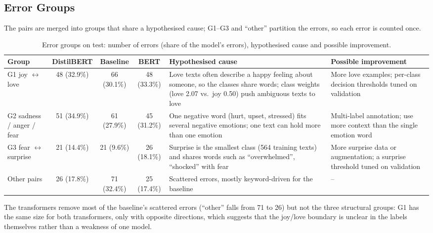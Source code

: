 \documentclass[11pt,a4paper]{article}
\begin{document}
\subsection{Error Groups}
The pairs are merged into groups that share a hypothesised cause; G1--G3 and ``other'' partition the errors, so each error is counted once.

\begin{table}[H]
\centering
\caption{Error groups on test: number of errors (share of the model's errors), hypothesised cause and possible improvement.}
\label{tab:groups}
\footnotesize
\begin{tabularx}{\textwidth}{@{}p{2.2cm}ccc LL@{}}
\toprule
\textbf{Group} & \textbf{DistilBERT} & \textbf{Baseline} & \textbf{BERT} & \textbf{Hypothesised cause} & \textbf{Possible improvement}\\
\midrule
G1 joy $\leftrightarrow$ love & 48 (32.9\%) & 66 (30.1\%) & 48 (33.3\%) & Love texts often describe a happy feeling about someone, so the classes share words; class weights (love 2.07 vs.\ joy 0.50) push ambiguous texts to love & More love examples; per-class decision thresholds tuned on validation\\
\addlinespace
G2 sadness / anger / fear & 51 (34.9\%) & 61 (27.9\%) & 45 (31.2\%) & One negative word (hurt, upset, stressed) fits several negative emotions; one text can hold more than one emotion & Multi-label annotation; use more context than the single emotion word\\
\addlinespace
G3 fear $\leftrightarrow$ surprise & 21 (14.4\%) & 21 (9.6\%) & 26 (18.1\%) & Surprise is the smallest class (564 training texts) and shares words such as ``overwhelmed'', ``shocked'' with fear & More surprise data or augmentation; a surprise threshold tuned on validation\\
\addlinespace
Other pairs & 26 (17.8\%) & 71 (32.4\%) & 25 (17.4\%) & Scattered errors, mostly keyword-driven for the baseline & --\\
\bottomrule
\end{tabularx}
\end{table}

The transformers remove most of the baseline's scattered errors (``other'' falls from 71 to 26) but not the three structural groups: G1 has the same size for both transformers, only with opposite directions, which suggests that the joy/love boundary is unclear in the labels themselves rather than a weakness of one model.
\end{document}
